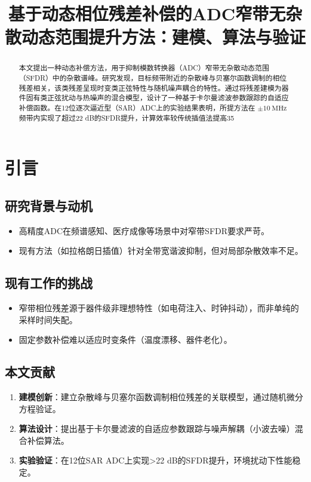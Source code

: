 \documentclass[conference]{IEEEtran}
\begin{document}
\title{基于动态相位残差补偿的ADC窄带无杂散动态范围提升方法：建模、算法与验证}

\author{}
\maketitle

\begin{abstract}
本文提出一种动态补偿方法，用于抑制模数转换器（ADC）窄带无杂散动态范围（SFDR）中的杂散谱峰。研究发现，目标频带附近的杂散峰与贝塞尔函数调制的相位残差相关，该类残差呈现时变类正弦特性与随机噪声耦合的特性。通过将残差建模为器件固有类正弦扰动与热噪声的混合模型，设计了一种基于卡尔曼滤波参数跟踪的自适应补偿函数。在12位逐次逼近型（SAR）ADC上的实验结果表明，所提方法在 $\pm 10\ \text{MHz}$ 频带内实现了超过22 dB的SFDR提升，计算效率较传统插值法提高35%
\end{abstract}

\section{引言}

\subsection{研究背景与动机}
\begin{itemize}
    \item 高精度ADC在频谱感知、医疗成像等场景中对窄带SFDR要求严苛。
    \item 现有方法（如拉格朗日插值）针对全带宽谐波抑制，但对局部杂散效率不足。
\end{itemize}

\subsection{现有工作的挑战}
\begin{itemize}
    \item 窄带相位残差源于器件级非理想特性（如电荷注入、时钟抖动），而非单纯的采样时间失配。
    \item 固定参数补偿难以适应时变条件（温度漂移、器件老化）。
\end{itemize}

\subsection{本文贡献}
\begin{enumerate}
    \item \textbf{建模创新}：建立杂散峰与贝塞尔函数调制相位残差的关联模型，通过随机微分方程验证。
    \item \textbf{算法设计}：提出基于卡尔曼滤波的自适应参数跟踪与噪声解耦（小波去噪）混合补偿算法。
    \item \textbf{实验验证}：在12位SAR ADC上实现>22 dB的SFDR提升，环境扰动下性能稳定。
\end{enumerate}
\end{document}
